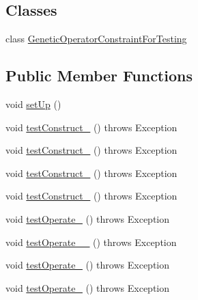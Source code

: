 \subsection*{Classes}
\begin{DoxyCompactItemize}
\item 
class \hyperlink{classorg_1_1jgap_1_1impl_1_1_two_way_mutation_operator_test_1_1_genetic_operator_constraint_for_testing}{Genetic\-Operator\-Constraint\-For\-Testing}
\end{DoxyCompactItemize}
\subsection*{Public Member Functions}
\begin{DoxyCompactItemize}
\item 
void \hyperlink{classorg_1_1jgap_1_1impl_1_1_two_way_mutation_operator_test_a63a92c35435399bf80c3955dbdd533c1}{set\-Up} ()
\item 
void \hyperlink{classorg_1_1jgap_1_1impl_1_1_two_way_mutation_operator_test_add6698cf3ff31ab61fd8d9ebc2098bf5}{test\-Construct\-\_} ()  throws Exception 
\item 
void \hyperlink{classorg_1_1jgap_1_1impl_1_1_two_way_mutation_operator_test_ae758de62bd6d05954399b44507436f23}{test\-Construct\-\_} ()  throws Exception 
\item 
void \hyperlink{classorg_1_1jgap_1_1impl_1_1_two_way_mutation_operator_test_a2d8517cf9d49e3caf9ccb8ad9968df7d}{test\-Construct\-\_} ()  throws Exception 
\item 
void \hyperlink{classorg_1_1jgap_1_1impl_1_1_two_way_mutation_operator_test_a726dc47baf5840268b9be1c488928a00}{test\-Construct\-\_} ()  throws Exception 
\item 
void \hyperlink{classorg_1_1jgap_1_1impl_1_1_two_way_mutation_operator_test_a99778a336f692aa1641e5c89f9314031}{test\-Operate\-\_} ()  throws Exception 
\item 
void \hyperlink{classorg_1_1jgap_1_1impl_1_1_two_way_mutation_operator_test_a5e7ecb066dff7b1ff085ba661258320a}{test\-Operate\-\_\-\_} ()  throws Exception 
\item 
void \hyperlink{classorg_1_1jgap_1_1impl_1_1_two_way_mutation_operator_test_a67731e9951a3c7c0acdf94f029813297}{test\-Operate\-\_} ()  throws Exception 
\item 
void \hyperlink{classorg_1_1jgap_1_1impl_1_1_two_way_mutation_operator_test_a9397117401cd6b22c1135fc9a4a39443}{test\-Operate\-\_} ()  throws Exception 
\item 

\end{DoxyCompactItemize}
